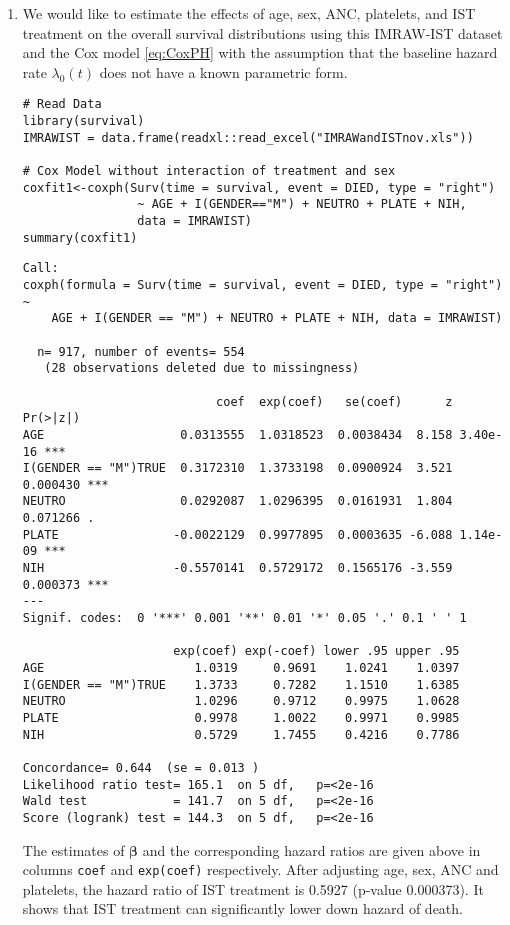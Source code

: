 \documentclass[11pt]{article}
\newcommand{\bbeta}{{\bm \beta}}
\begin{document}
\begin{enumerate}
\item We would like to estimate the effects of age, sex, ANC, platelets, and IST
treatment on the overall survival distributions using this IMRAW-IST dataset and
the Cox model \eqref{eq:CoxPH} with the assumption that the baseline hazard rate
$\lambda_0(t)$ does not have a known parametric form.

\begin{lstlisting}
# Read Data
library(survival)
IMRAWIST = data.frame(readxl::read_excel("IMRAWandISTnov.xls"))

# Cox Model without interaction of treatment and sex
coxfit1<-coxph(Surv(time = survival, event = DIED, type = "right") 
                ~ AGE + I(GENDER=="M") + NEUTRO + PLATE + NIH,
                data = IMRAWIST)
summary(coxfit1)
\end{lstlisting}

\begin{Verbatim}[fontsize=\small]
Call:
coxph(formula = Surv(time = survival, event = DIED, type = "right") ~ 
    AGE + I(GENDER == "M") + NEUTRO + PLATE + NIH, data = IMRAWIST)

  n= 917, number of events= 554 
   (28 observations deleted due to missingness)

                           coef  exp(coef)   se(coef)      z Pr(>|z|)    
AGE                   0.0313555  1.0318523  0.0038434  8.158 3.40e-16 ***
I(GENDER == "M")TRUE  0.3172310  1.3733198  0.0900924  3.521 0.000430 ***
NEUTRO                0.0292087  1.0296395  0.0161931  1.804 0.071266 .  
PLATE                -0.0022129  0.9977895  0.0003635 -6.088 1.14e-09 ***
NIH                  -0.5570141  0.5729172  0.1565176 -3.559 0.000373 ***
---
Signif. codes:  0 '***' 0.001 '**' 0.01 '*' 0.05 '.' 0.1 ' ' 1

                     exp(coef) exp(-coef) lower .95 upper .95
AGE                     1.0319     0.9691    1.0241    1.0397
I(GENDER == "M")TRUE    1.3733     0.7282    1.1510    1.6385
NEUTRO                  1.0296     0.9712    0.9975    1.0628
PLATE                   0.9978     1.0022    0.9971    0.9985
NIH                     0.5729     1.7455    0.4216    0.7786

Concordance= 0.644  (se = 0.013 )
Likelihood ratio test= 165.1  on 5 df,   p=<2e-16
Wald test            = 141.7  on 5 df,   p=<2e-16
Score (logrank) test = 144.3  on 5 df,   p=<2e-16
\end{Verbatim}

The estimates of $\bbeta$ and the corresponding hazard ratios are given above 
in columns \texttt{coef} and \texttt{exp(coef)} respectively. After adjusting
age, sex, ANC and platelets, the hazard ratio of IST treatment is 0.5927
(p-value 0.000373). It shows that IST treatment can significantly lower down
hazard of death.


\end{enumerate}
\end{document}
